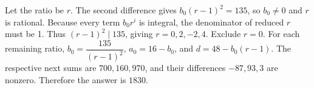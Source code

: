 Let the ratio be $r$. The second difference gives $b_0(r-1)^2=135$, so $b_0\ne0$ and $r$ is rational. Because every term $b_0r^i$ is integral, the denominator of reduced $r$ must be 1. Thus $(r-1)^2\mid135$, giving $r=0,2,-2,4$. Exclude $r=0$. For each remaining ratio, $b_0 = \dfrac{135}{(r-1)^2}$, $a_0=16-b_0$, and $d=48-b_0(r-1)$. The respective next sums are $700,160,970$, and their differences $-87,93,3$ are nonzero. Therefore the answer is $\boxed{1830}$.
